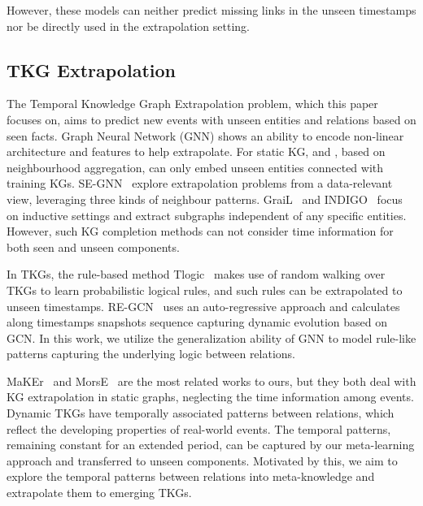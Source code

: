 \documentclass[sigconf]{acmart}
\begin{document}
However, these models can neither predict missing links in the unseen timestamps nor be directly used in the extrapolation setting.

\subsection{TKG Extrapolation}
The Temporal Knowledge Graph Extrapolation problem, which this paper focuses on, aims to predict new events with unseen entities and relations based on seen facts. Graph Neural Network (GNN) shows an ability to encode non-linear architecture and features to help extrapolate. For static KG,  \citet{Hamaguchi2017KnowledgeTF} and \citet{Wang2019LogicAB}, based on neighbourhood aggregation, can only embed unseen entities connected with training KGs. SE-GNN~\citep{SEGNN} explore extrapolation problems from a data-relevant view, leveraging three kinds of neighbour patterns. GraiL~\citep{GraiL} and INDIGO~\citep{INDIGO} focus on inductive settings and extract subgraphs independent of any specific entities. However, such KG completion methods can not consider time information for both seen and unseen components. 
\par
In TKGs, the rule-based method Tlogic~\citep{Tlogic} makes use of random walking over TKGs to learn probabilistic logical rules, and such rules can be extrapolated to unseen timestamps. RE-GCN~\citep{REGCN} uses an auto-regressive approach and calculates along timestamps snapshots sequence capturing dynamic evolution based on GCN. In this work, we utilize the generalization ability of GNN to model rule-like patterns capturing the underlying logic between relations.
\par
MaKEr~\citep{MaKEr} and MorsE~\citep{MorsE} are the most related works to ours, but they both deal with KG extrapolation in static graphs, neglecting the time information among events. 
Dynamic TKGs have temporally associated patterns between relations, which reflect the developing properties of real-world events. 
The temporal patterns, remaining constant for an extended period, can be captured by our meta-learning approach and transferred to unseen components. Motivated by this, we aim to explore the temporal patterns between relations into meta-knowledge and extrapolate them to emerging TKGs.
\end{document}
